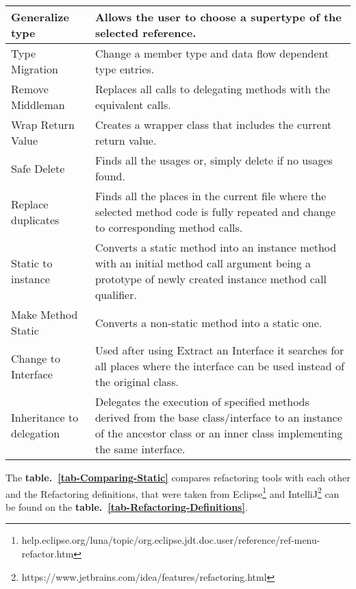 \begin{table}[htbp]
\begin{tabular}{ p{2.95cm}| p{9.15cm}}
Generalize type           & Allows the user to choose a supertype of the selected reference.                                                                                                          \\ \hline
Type Migration            & Change a member type and data flow dependent type entries.                                                                                                                \\ \hline
Remove Middleman          & Replaces all calls to delegating methods with the equivalent calls.                                                                                                       \\ \hline
Wrap Return Value         & Creates a wrapper class that includes the current return value.                                                                                                           \\ \hline
Safe Delete               & Finds all the usages or, simply delete if no usages found.                                                                                                                \\ \hline
Replace duplicates        & Finds all the places in the current file where the selected method code is fully repeated and change to corresponding method calls.                                      \\ \hline
Static to instance        & Converts a static method into an instance method with an initial method call argument being a prototype of newly created instance method call qualifier.                  \\ \hline
Make Method Static        & Converts a non-static method into a static one.                                                                                                                           \\ \hline
Change to Interface       & Used after using Extract an Interface it searches for all places where the interface can be used instead of the original class.                                             \\ \hline
Inheritance to delegation & Delegates the execution of specified methods derived from the base class/interface to an instance of the ancestor class or an inner class implementing the same interface. \\ \hline
\end{tabular}
\end{table}
The {\bf table.~\ref{tab-Comparing-Static}} compares refactoring tools with each other and the Refactoring definitions, that were taken from Eclipse\footnote{help.eclipse.org/luna/topic/org.eclipse.jdt.doc.user/reference/ref-menu-refactor.htm} and IntelliJ\footnote{https://www.jetbrains.com/idea/features/refactoring.html} can be found on the {\bf table.~\ref{tab-Refactoring-Definitions}}.

